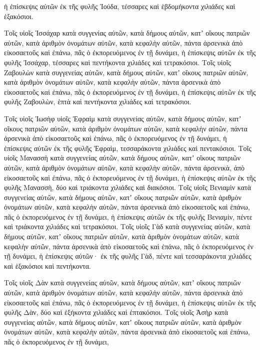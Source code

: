 {ἡ ἐπίσκεψις αὐτῶν ἐκ τῆς φυλῆς Ἰούδα, τέσσαρες καὶ ἑβδομήκοντα χιλιάδες καὶ ἑξακόσιοι.
\par }{\PP {}Τοῖς υἱοῖς Ἰσσάχαρ κατὰ συγγενίας αὐτῶν, κατὰ δήμους αὐτῶν, κατʼ οἴκους πατριῶν αὐτῶν, κατὰ ἀριθμὸν ὀνομάτων αὐτῶν, κατὰ κεφαλὴν αὐτῶν, πάντα ἀρσενικὰ ἀπὸ εἰκοσαετοῦς καὶ ἐπάνω, πᾶς ὁ ἐκπορευόμενος ἐν τῇ δυνάμει,
ἡ ἐπίσκεψις αὐτῶν ἐκ τῆς φυλῆς Ἰσσάχαρ, τέσσαρες καὶ πεντήκοντα χιλιάδες καὶ τετρακόσιοι.
Τοῖς υἱοῖς Ζαβουλὼν κατὰ συγγενείας αὐτῶν, κατὰ δήμους αὐτῶν, κατʼ οἴκους πατριῶν αὐτῶν, κατὰ ἀριθμὸν ὀνομάτων αὐτῶν, κατὰ κεφαλὴν αὐτῶν, πάντα ἀρσενικὰ ἀπὸ εἰκοσαετοῦς καὶ ἐπάνω, πᾶς ὁ ἐκπορευόμενος ἐν τῇ δυνάμει,
ἡ ἐπίσκεψις αὐτῶν ἐκ τῆς φυλῆς Ζαβουλὼν, ἑπτὰ καὶ πεντήκοντα χιλιάδες καὶ τετρακόσιοι.
\par }{\PP {}Τοῖς υἱοῖς Ἰωσὴφ υἱοῖς Ἐφραὶμ κατὰ συγγενείας αὐτῶν, κατὰ δήμους αὐτῶν, κατʼ οἴκους πατριῶν αὐτῶν, κατὰ ἀριθμὸν ὀνομάτων αὐτῶν, κατὰ κεφαλὴν αὐτῶν, πάντα ἀρσενικὰ ἀπὸ εἰκοσαετοῦς καὶ ἐπάνω, πᾶς ὁ ἐκπορευόμενος ἐν τῇ δυνάμει,
ἡ ἐπίσκεψις αὐτῶν ἐκ τῆς φυλῆς Ἐφραὶμ, τεσσαράκοντα χιλιάδες καὶ πεντακόσιοι.
Τοῖς υἱοῖς Μανασσὴ κατὰ συγγενείας αὐτῶν, κατὰ δήμους αὐτῶν, κατʼ οἴκους πατριῶν αὐτῶν, κατὰ ἀριθμὸν ὀνομάτων αὐτῶν, κατὰ κεφαλὴν αὐτῶν, πάντα ἀρσενικὰ, ἀπὸ εἰκοσαετοῦς καὶ ἐπάνω, πᾶς ὁ ἐκπορευόμενος ἐν τῇ δυνάμει,
ἡ ἐπίσκεψις αὐτῶν ἐκ τῆς φυλῆς Μανασσὴ, δύο καὶ τριάκοντα χιλιάδες καὶ διακόσιοι.
Τοῖς υἱοῖς Βενιαμὶν κατὰ συγγενείας αὐτῶν, κατὰ δήμους αὐτῶν, κατʼ οἴκους πατριῶν αὐτῶν, κατὰ ἀριθμὸν ὀνομάτων αὐτῶν, κατὰ κεφαλὴν αὐτῶν, πάντα ἀρσενικὰ ἀπὸ εἰκοσαετοῦς καὶ ἐπάνω, πᾶς ὁ ἐκπορευόμενος ἐν τῇ δυνάμει,
ἡ ἐπίσκεψις αὐτῶν ἐκ τῆς φυλῆς Βενιαμὶν, πέντε καὶ τριάκοντα χιλιάδες καὶ τετρακόσιοι.
Τοῖς υἱοῖς Γὰδ κατὰ συγγενείας αὐτῶν, κατὰ δήμους αὐτῶν, κατʼ οἴκους πατριῶν αὐτῶν, κατὰ ἀριθμὸν ὀνομάτων αὐτῶν, κατὰ κεφαλὴν αὐτῶν, πάντα ἀρσενικὰ ἀπὸ εἰκοσαετοῦς καὶ ἐπάνω, πᾶς ὁ ἐκπορευόμενος ἐν τῇ δυνάμει,
ἡ ἐπίσκεψις αὐτῶν· ἐκ τῆς φυλῆς Γὰδ, πέντε καὶ τεσσαράκοντα χιλιάδες καὶ ἑξακόσιοι καὶ πεντήκοντα.
\par }{\PP {}Τοῖς υἱοῖς Δὰν κατὰ συγγενείας αὐτῶν, κατὰ δήμους αὐτῶν, κατʼ οἴκους πατριῶν αὐτῶν, κατὰ ἀριθμὸν ὀνομάτων αὐτῶν, κατὰ κεφαλὴν αὐτῶν, πάντα ἀρσενικὰ ἀπὸ εἰκοσαετοῦς καὶ ἐπάνω, πᾶς ὁ ἐκπορευόμενος ἐν τῇ δυνάμει,
ἡ ἐπίσκεψις αὐτῶν ἐκ τῆς φυλῆς Δὰν, δύο καὶ ἑξήκοντα χιλιάδες καὶ ἑπτακόσιοι.
Τοῖς υἱοῖς Ἀσὴρ κατὰ συγγενείας αὐτῶν, κατὰ δήμους αὐτῶν, κατʼ οἴκους πατριῶν αὐτῶν, κατὰ ἀριθμὸν ὀνομάτων αὐτῶν, κατὰ κεφαλὴν αὐτῶν, πάντα ἀρσενικὰ ἀπὸ εἰκοσαετοῦς καὶ ἐπάνω, πᾶς ὁ ἐκπορευόμενος ἐν τῇ δυνάμει,
}
